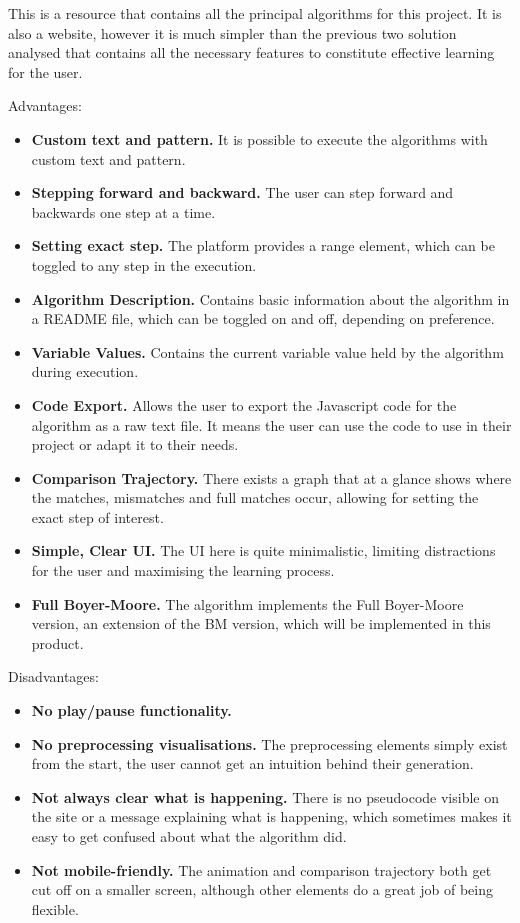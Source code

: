 This is a resource that contains all the principal algorithms for this project. It is also a website, however it is much simpler than the previous two solution analysed that contains all the necessary features to constitute effective learning for the user.

Advantages:
\begin{itemize}
    \item \textbf{Custom text and pattern.} It is possible to execute the algorithms with custom text and pattern.
    \item \textbf{Stepping forward and backward.} The user can step forward and backwards one step at a time.
    \item \textbf{Setting exact step.} The platform provides a range element, which can be toggled to any step in the execution.
    \item \textbf{Algorithm Description.} Contains basic information about the algorithm in a README file, which can be toggled on and off, depending on preference.
    \item \textbf{Variable Values.} Contains the current variable value held by the algorithm during execution.
    \item \textbf{Code Export.} Allows the user to export the Javascript code for the algorithm as a raw text file. It means the user can use the code to use in their project or adapt it to their needs.
    \item \textbf{Comparison Trajectory.} There exists a graph that at a glance shows where the matches, mismatches and full matches occur, allowing for setting the exact step of interest.
    \item \textbf{Simple, Clear UI.} The UI here is quite minimalistic, limiting distractions for the user and maximising the learning process.
    \item \textbf{Full Boyer-Moore.} The algorithm implements the Full Boyer-Moore version, an extension of the BM version, which will be implemented in this product.
\end{itemize}


Disadvantages:
\begin{itemize}
    \item \textbf{No play/pause functionality.}
    \item \textbf{No preprocessing visualisations.} The preprocessing elements simply exist from the start, the user cannot get an intuition behind their generation.
    \item \textbf{Not always clear what is happening.} There is no pseudocode visible on the site or a message explaining what is happening, which sometimes makes it easy to get confused about what the algorithm did.
    \item \textbf{Not mobile-friendly.} The animation and comparison trajectory both get cut off on a smaller screen, although other elements do a great job of being flexible.
\end{itemize}


